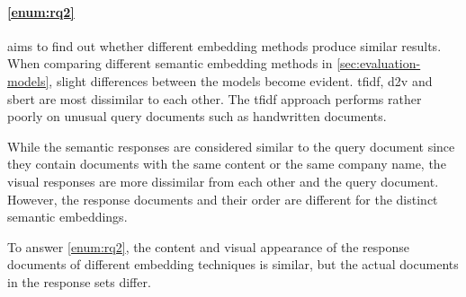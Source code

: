 \paragraph{\ref{enum:rq2}} aims to find out whether different embedding methods produce similar results.
When comparing different semantic embedding methods in \autoref{sec:evaluation-models}, 
slight differences between the models become evident.
\ac{tfidf}, \ac{d2v} and \ac{sbert} are most dissimilar to each other.
The \ac{tfidf} approach performs rather poorly on unusual query documents such as handwritten documents.

While the semantic responses are considered similar to the query document since
they contain documents with the same content 
or the same company name,
the visual responses are more dissimilar from each other and the query document.
However, the response documents and their order are different for the distinct semantic embeddings.


To answer \ref{enum:rq2}, the content and visual appearance of the response documents 
of different embedding techniques is similar,
but the actual documents in the response sets differ.

